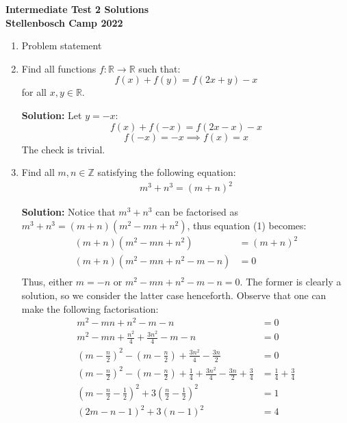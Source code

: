 \documentclass{article}
\begin{document}
\thispagestyle{empty}

\begin{center}
  \textbf{Intermediate Test 2 Solutions}
  \\ \vspace{1em}
  \textbf{\large Stellenbosch Camp 2022}
\end{center}


\begin{enumerate}[itemsep=\fill]

\item %
Problem statement


\item %
Find all functions $f:\mathbb{R}\to\mathbb{R}$ such that:
\[f(x) + f(y) = f(2x+y) - x\] for all $x,y\in\mathbb{R}$.

\textbf{Solution:} Let $y = -x$:
\[f(x) + f(-x) = f(2x-x) - x\]
\[f(-x) = -x\implies f(x) = x\]
The check is trivial.

\item 
Find all $m,n\in \mathbb{Z}$ satisfying the following equation:
\begin{align}
m^3 + n^3 = (m+n)^2 
\end{align}

\textbf{Solution:} Notice that $m^3 + n^3$ can be factorised as $m^3 + n^3=(m+n)(m^{2} -mn + n^{2})$, thus equation (1) becomes:
\begin{align*}
    (m+n)(m^{2} -mn + n^{2}) & = (m+n)^2\\
    (m+n)(m^{2} -mn + n^{2} -m -n) & = 0 \\
\end{align*}
Thus, either $m = -n$ or $m^{2} -mn + n^{2} -m -n = 0$. The former is clearly a solution, so we consider the latter case henceforth. Observe that one can make the following factorisation:
\begin{align}
    m^{2} -mn + n^{2} -m -n & = 0 \nonumber\\ 
    m^{2} - mn + \frac{n^{2}}{4} + \frac{3n^{2}}{4} - m -n & = 0 \nonumber\\
    \left(m - \frac{n}{2}\right)^{2} - \left(m - \frac{n}{2}\right) + \frac{3n^{2}}{4} - \frac{3n}{2} & = 0 \nonumber\\
    \left(m - \frac{n}{2}\right)^{2} - \left(m - \frac{n}{2}\right) + \frac{1}{4} + \frac{3n^{2}}{4} - \frac{3n}{2} + \frac{3}{4} & = \frac{1}{4} +\frac{3}{4} \nonumber\\
    \left(m - \frac{n}{2} - \frac{1}{2}\right)^{2} +3\left(\frac{n}{2} - \frac{1}{2}\right)^{2} & = 1 \nonumber\\
    (2m - n - 1)^{2} + 3(n-1)^{2} & = 4 
\end{align}


\end{enumerate}
\end{document}
